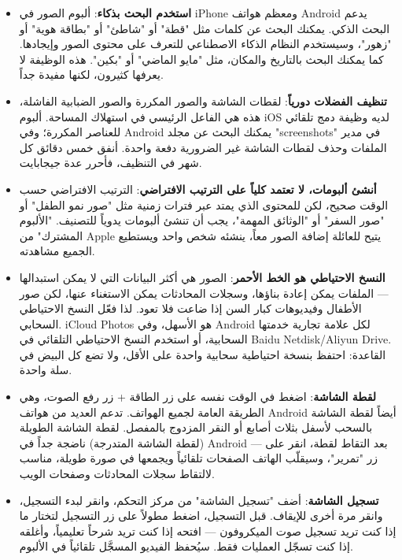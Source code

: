 \begin{itemize}
  \item \textbf{استخدم البحث بذكاء}: ألبوم الصور في iPhone ومعظم هواتف Android يدعم البحث الذكي. يمكنك البحث عن كلمات مثل "قطة" أو "شاطئ" أو "بطاقة هوية" أو "زهور"، وسيستخدم النظام الذكاء الاصطناعي للتعرف على محتوى الصور وإيجادها. كما يمكنك البحث بالتاريخ والمكان، مثل "مايو الماضي" أو "بكين". هذه الوظيفة لا يعرفها كثيرون، لكنها مفيدة جداً.
  \item \textbf{تنظيف الفضلات دورياً}: لقطات الشاشة والصور المكررة والصور الضبابية الفاشلة، هذه هي الفاعل الرئيسي في استهلاك المساحة. ألبوم iOS لديه وظيفة دمج تلقائي للعناصر المكررة؛ وفي Android يمكنك البحث عن مجلد "screenshots" في مدير الملفات وحذف لقطات الشاشة غير الضرورية دفعة واحدة. أنفق خمس دقائق كل شهر في التنظيف، فأحرر عدة جيجابايت.
  \item \textbf{أنشئ ألبومات، لا تعتمد كلياً على الترتيب الافتراضي}: الترتيب الافتراضي حسب الوقت صحيح، لكن للمحتوى الذي يمتد عبر فترات زمنية مثل "صور نمو الطفل" أو "صور السفر" أو "الوثائق المهمة"، يجب أن تنشئ ألبومات يدوياً للتصنيف. "الألبوم المشترك" من Apple يتيح للعائلة إضافة الصور معاً، ينشئه شخص واحد ويستطيع الجميع مشاهدته.
  \item \textbf{النسخ الاحتياطي هو الخط الأحمر}: الصور هي أكثر البيانات التي لا يمكن استبدالها — الملفات يمكن إعادة بناؤها، وسجلات المحادثات يمكن الاستغناء عنها، لكن صور الأطفال وفيديوهات كبار السن إذا ضاعت فلا تعود. لذا فعّل النسخ الاحتياطي السحابي. iCloud Photos هو الأسهل، وفي Android لكل علامة تجارية خدمتها السحابية، أو استخدم النسخ الاحتياطي التلقائي في Baidu Netdisk/Aliyun Drive. القاعدة: احتفظ بنسخة احتياطية سحابية واحدة على الأقل، ولا تضع كل البيض في سلة واحدة.
\end{itemize}


\begin{itemize}
  \item \textbf{لقطة الشاشة}: اضغط في الوقت نفسه على زر الطاقة + زر رفع الصوت، وهي الطريقة العامة لجميع الهواتف. تدعم العديد من هواتف Android أيضاً لقطة الشاشة بالسحب لأسفل بثلاث أصابع أو النقر المزدوج بالمفصل. لقطة الشاشة الطويلة (لقطة الشاشة المتدرجة) ناضجة جداً في Android — بعد التقاط لقطة، انقر على زر "تمرير"، وسيقلّب الهاتف الصفحات تلقائياً ويجمعها في صورة طويلة، مناسب لالتقاط سجلات المحادثات وصفحات الويب.
  \item \textbf{تسجيل الشاشة}: أضف "تسجيل الشاشة" من مركز التحكم، وانقر لبدء التسجيل، وانقر مرة أخرى للإيقاف. قبل التسجيل، اضغط مطولاً على زر التسجيل لتختار ما إذا كنت تريد تسجيل صوت الميكروفون — افتحه إذا كنت تريد شرحاً تعليمياً، وأغلقه إذا كنت تسجّل العمليات فقط. سيُحفظ الفيديو المسجَّل تلقائياً في الألبوم.
\end{itemize}

